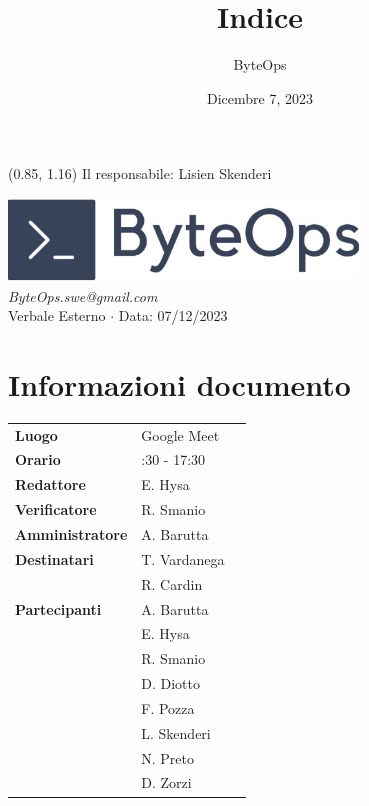 \documentclass{article}
\title{\textbf{\fontsize{28}{6}\selectfont Indice}}
\author{\fontsize{14}{6}\selectfont ByteOps}
\date{Dicembre 7, 2023}
\begin{document}
\begin{textblock*}{\textwidth}(0.85\textwidth, 1.16\textheight)
    Il responsabile: Lisien Skenderi
\end{textblock*}

\pagestyle{fancy}
\begin{center}
\includegraphics[width = 0.7\textwidth]{../../../Images/logo.png} \\
\vspace{0.2cm}
\textcolor[RGB]{60, 60, 60}{\textit{ByteOps.swe@gmail.com}} \\
\vspace{1cm}
\fontsize{16}{6}\selectfont Verbale Esterno $\cdot$ Data: 07/12/2023 \\
\vspace{0.5cm}
\end{center}

\section*{Informazioni documento}
\def\arraystretch{1.2}
\begin{tabular}{>{\raggedleft\arraybackslash}p{}|>{\raggedright\arraybackslash}p{}c}
\hline
\addlinespace
\textbf{Luogo} & Google Meet \vspace{10pt} \\
\textbf{Orario} & 16:30 - 17:30 \vspace{10pt} \\
\textbf{Redattore} & E. Hysa \vspace{10pt} \\
\textbf{Verificatore} & R. Smanio \vspace{10pt} \\
\textbf{Amministratore} & A. Barutta \vspace{10pt} \\
\textbf{Destinatari} & T. Vardanega \\ & R. Cardin \vspace{10pt} \\
\textbf{Partecipanti} & A. Barutta \\ & E. Hysa \\ & R. Smanio \\ & D. Diotto \\ & F. Pozza \\ & L. Skenderi \\ & N. Preto \\ & D. Zorzi \vspace{10pt}
\end{tabular}
\pagebreak 
\end{document}
